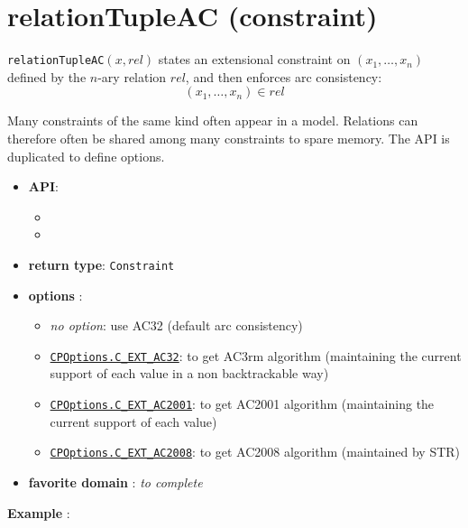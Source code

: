 \label{relationtupleac}
\hypertarget{relationtupleac}{}

\section{relationTupleAC (constraint)}\label{relationtupleac:relationtupleacconstraint}\hypertarget{relationtupleac:relationtupleacconstraint}{}
\begin{notedef}
  \texttt{relationTupleAC}$(x,rel)$ states an extensional constraint on $(x_1,\ldots,x_n)$ defined by the $n$-ary relation $rel$, and then enforces arc consistency:
$$(x_1,\ldots,x_n)\in rel$$
\end{notedef}
Many constraints of the same kind often appear in a model. Relations can therefore often be shared among many constraints to spare memory.
The API is duplicated to define options.

\begin{itemize}
	\item \textbf{API}:
	\begin{itemize}
		\item {}
		\item {}
	\end{itemize}
	\item \textbf{return type}: \texttt{Constraint}
	\item \textbf{options} :
	\begin{itemize}
		\item \emph{no option}: use AC32 (default arc consistency)
		\item \hyperlink{cext32:cext32options}{\tt CPOptions.C\_EXT\_AC32}: to get AC3rm algorithm (maintaining the current support of each value in a non backtrackable way)
		\item \hyperlink{cext2001:cext2001options}{\tt CPOptions.C\_EXT\_AC2001}: to get AC2001 algorithm (maintaining the current support of each value)
		\item \hyperlink{cext2008:cext2008options}{\tt CPOptions.C\_EXT\_AC2008}: to get AC2008 algorithm (maintained by STR)
	\end{itemize}
	\item \textbf{favorite domain} : \emph{to complete}
\end{itemize}

\textbf{Example} :

